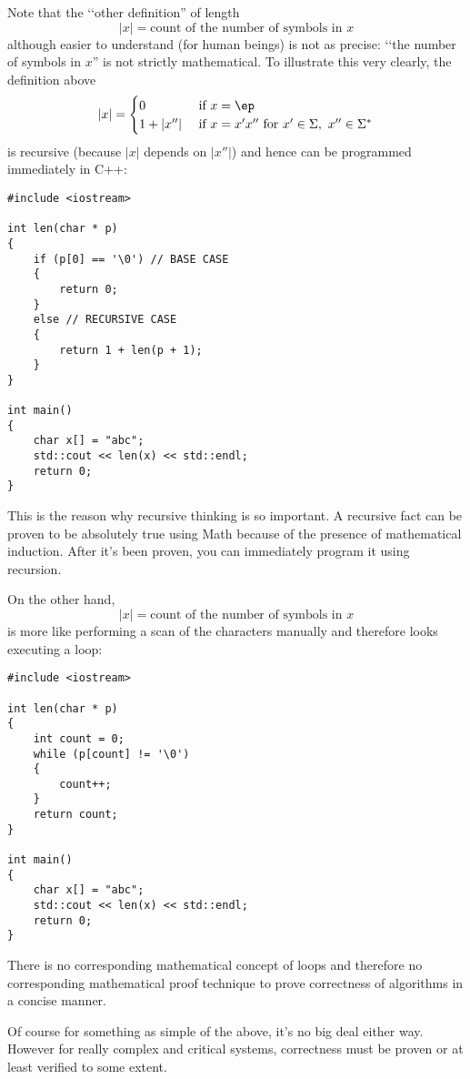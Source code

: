 Note that the \lq\lq other definition'' of length 
\[
|x| = \text{count of the number of symbols in $x$}
\]
although easier to understand (for human beings) is not as precise:
\lq\lq the number of symbols in $x$'' is not strictly mathematical.
To illustrate this very clearly, the definition above
\[
|x| =
\begin{cases}
0       & \text{ if $x = \ep$} \\
1 + |x''| & \text{ if $x = x'x''$ for $x' \in \Sigma, \ x'' \in \Sigma^*$}
\end{cases}
\]
is recursive (because $|x|$ depends on $|x''|$) and hence can be programmed
immediately in C++:

\begin{Verbatim}[frame=single,fontsize=\small]
#include <iostream>

int len(char * p)
{
    if (p[0] == '\0') // BASE CASE
    {
        return 0;
    }
    else // RECURSIVE CASE
    {
        return 1 + len(p + 1);
    }
}

int main()
{
    char x[] = "abc";
    std::cout << len(x) << std::endl;
    return 0;
}
\end{Verbatim}

This is the reason why recursive thinking is so important.
A recursive fact can be proven to be absolutely true using
Math because of the presence of mathematical induction.
After it's been proven, you can immediately program it using
recursion.

On the other hand, 
\[
|x| = \text{count of the number of symbols in $x$}
\]
is more like performing a scan of the characters manually and therefore looks
executing a loop:
\begin{Verbatim}[frame=single]
#include <iostream>

int len(char * p)
{
    int count = 0;
    while (p[count] != '\0')
    {
        count++;
    }
    return count;
}

int main()
{
    char x[] = "abc";
    std::cout << len(x) << std::endl;
    return 0;
}
\end{Verbatim}

There is no corresponding mathematical concept of loops
and therefore no corresponding mathematical proof technique to prove
correctness of algorithms in a concise manner.

Of course for something as simple of the above, it's no big deal either way.
However for really complex and critical systems, correctness must be
proven or at least verified to some extent.

